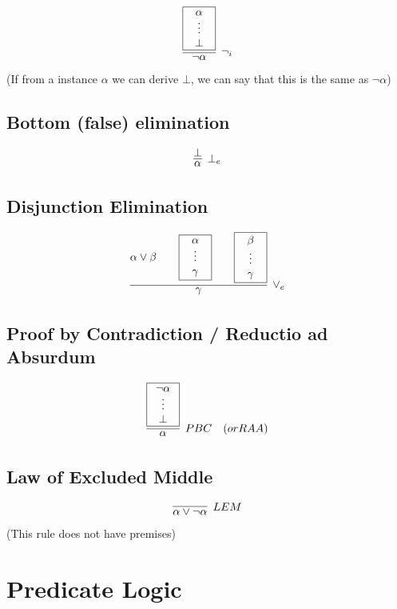 \documentclass{article}
\newcommand{\rulename}[1]{#1}
\begin{document}
    \begin{align*}
      \infer[\rulename{\neg_i}]
      {\neg \alpha}
      {
        \framebox{\parbox{.8cm}{\centerline{$\alpha$}\centerline{$\vdots$}\centerline{$\bot$}}}
      }
    \end{align*}
    (If from a instance $\alpha$ we can derive $\bot$, we can say that this is the same as $\neg\alpha$)
    
\subsection*{Bottom (false) elimination}
    \begin{align*}
      \infer[\rulename{\bot_e}]
      {\alpha}
      {\bot}
    \end{align*}
    
\subsection*{Disjunction Elimination}
    \begin{align*}
      \infer[\rulename{\vee_e}]
      {\gamma}
      {
        \alpha \vee \beta && 
        \framebox{\parbox{.8cm}{\centerline{$\alpha$}\centerline{$\vdots$}\centerline{$\gamma$}}} 
        &&
        \framebox{\parbox{.8cm}{\centerline{$\beta$}\centerline{$\vdots$}\centerline{$\gamma$}}} 
      }
    \end{align*}

\subsection*{Proof by Contradiction / Reductio ad Absurdum}
    \begin{align*}
        \infer[\rulename{PBC} \quad (or \rulename{RAA})]
      {\alpha}
      {\framebox{\parbox{.8cm}{\centerline{$\neg\alpha$}\centerline{$\vdots$}\centerline{$\bot$}}}}
    \end{align*}

\subsection*{Law of Excluded Middle}
    \vspace{3ex}
    \begin{align*}
       \infer[\rulename{LEM}]
      {\alpha \vee \neg \alpha}
      {
      } 
    \end{align*}
    (This rule does not have premises)
    
\section*{Predicate Logic}
\end{document}
